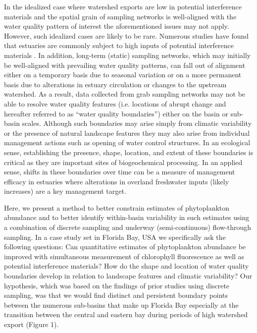 \documentclass[review]{elsarticle}
\begin{document}
In the idealized case where watershed exports are low in potential interference materials and the spatial grain of sampling networks is well-aligned with the water quality pattern of interest the aforementioned issues may not apply. However, such idealized cases are likely to be rare. Numerous studies have found that estuaries are commonly subject to high inputs of potential interference materials \citep[e.g. color dissolved organic matter;][]{du2010characteristics}. In addition, long-term (static) sampling networks, which may initially be well-aligned with prevailing water quality patterns, can fall out of alignment either on a temporary basis due to seasonal variation or on a more permanent basis due to alterations in estuary circulation or changes to the upstream watershed. As a result, data collected from grab sampling networks may not be able to resolve water quality features (i.e. locations of abrupt change and hereafter referred to as “water quality boundaries”) either on the basin or sub-basin scales. Although such boundaries may arise simply from climatic variability or the presence of natural landscape features they may also arise from individual management actions such as opening of water control structures. In an ecological sense, establishing the presence, shape, location, and extent of these boundaries is critical as they are important sites of biogeochemical processing. In an applied sense, shifts in these boundaries over time can be a measure of management efficacy in estuaries where alterations in overland freshwater inputs (likely increases) are a key management target.

Here, we present a method to better constrain estimates of phytoplankton abundance and to better identify within-basin variability in such estimates using a combination of discrete sampling and underway (semi-continuous) flow-through sampling. In a case study set in Florida Bay, USA we specifically ask the following questions: Can quantitative estimates of phytoplankton abundance be improved with simultaneous measurement of chlorophyll fluorescence as well as potential interference materials? How do the shape and location of water quality boundaries develop in relation to landscape features and climatic variability? Our hypothesis, which was based on the findings of prior studies using discrete sampling, was that we would find distinct and persistent boundary points between the numerous sub-basins that make up Florida Bay especially at the transition between the central and eastern bay during periods of high watershed export (Figure 1).
  
\end{document}
